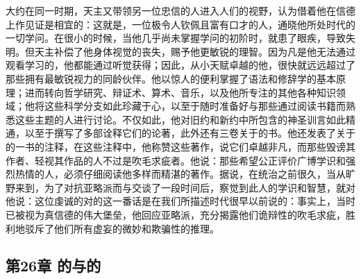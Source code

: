 大约在同一时期，天主又带领另一位忠信的人进入人们的视野，认为借着他在信德上作见证是相宜的：这就是，一位极令人钦佩且富有口才的人，通晓他所处时代的一切学问。在很小的时候，当他几乎尚未掌握学问的初阶时，就患了眼疾，导致失明。但天主补偿了他身体视觉的丧失，赐予他更敏锐的理智。因为凡是他无法通过观看学习的，他都能通过听觉获得；因此，从小天赋卓越的他，很快就远远超过了那些拥有最敏锐视力的同龄伙伴。他以惊人的便利掌握了语法和修辞学的基本原理；进而转向哲学研究、辩证术、算术、音乐，以及他所专注的其他各种知识领域；他将这些科学分支如此珍藏于心，以至于随时准备好与那些通过阅读书籍而熟悉这些主题的人进行讨论。不仅如此，他对旧约和新约中所包含的神圣训言如此精通，以至于撰写了多部诠释它们的论著，此外还有三卷关于的书。他还发表了关于的一书的注释，在这些注释中，他称赞这些著作，说它们卓越非凡，而那些毁谤其作者、轻视其作品的人不过是吹毛求疵者。他说：那些希望公正评价广博学识和强烈热情的人，必须仔细阅读他多样而精湛的著作。据说，在统治之前很久，当从旷野来到，为了对抗亚略派而与交谈了一段时间后，察觉到此人的学识和智慧，就对他说：这位虔诚的对的这一番话是在我们所描述时代很早以前说的：事实上，当时已被视为真信德的伟大堡垒，他回应亚略派，充分揭露他们诡辩性的吹毛求疵，胜利地驳斥了他们所有虚妄的微妙和欺骗性的推理。\par


\subsection{第26章 的与的}

